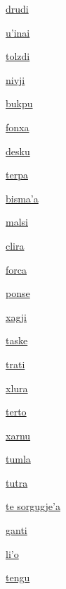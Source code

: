 {\hyperlink{val:drudi}{drudi}}{}{}{}

{\hyperlink{val:uhinai}{u'inai}}{}{}{}

{\hyperlink{val:tolzdi}{tolzdi}}{}{}{}

{\hyperlink{val:nivji}{nivji}}{}{}{}

{\hyperlink{val:bukpu}{bukpu}}{}{}{}

{\hyperlink{val:fonxa}{fonxa}}{}{}{}

{\hyperlink{val:desku}{desku}}{}{}{}

{\hyperlink{val:terpa}{terpa}}{}{}{}

{\hyperlink{val:bismaha}{bisma'a}}{}{}{}

{\hyperlink{val:malsi}{malsi}}{}{}{}

{\hyperlink{val:clira}{clira}}{}{}{}

{\hyperlink{val:forca}{forca}}{}{}{}

{\hyperlink{val:ponse}{ponse}}{}{}{}

{\hyperlink{val:xagji}{xagji}}{}{}{}

{\hyperlink{val:taske}{taske}}{}{}{}

{\hyperlink{val:trati}{trati}}{}{}{}

{\hyperlink{val:xlura}{xlura}}{}{}{}

{\hyperlink{val:terto}{terto}}{}{}{}

{\hyperlink{val:xarnu}{xarnu}}{}{}{}

{\hyperlink{val:tumla}{tumla}}{}{}{}

{\hyperlink{val:tutra}{tutra}}{}{}{}

{\hyperlink{val:sorgugjeha}{te sorgugje'a}}{}{}{}

{\hyperlink{val:ganti}{ganti}}{}{}{}

{\hyperlink{val:liho}{li'o}}{}{}{}

{\hyperlink{val:tengu}{tengu}}{}{}{}

